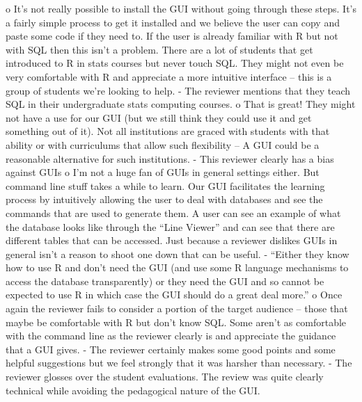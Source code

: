 \documentclass[11pt]{tise_style}
\begin{document}
o	It’s not really possible to install the GUI without going through these steps.  It’s a fairly simple process to get it installed and we believe the user can copy and paste some code if they need to.  If the user is already familiar with R but not with SQL then this isn’t a problem.  There are a lot of students that get introduced to R in stats courses but never touch SQL.  They might not even be very comfortable with R and appreciate a more intuitive interface – this is a group of students we’re looking to help.  
-	The reviewer mentions that they teach SQL in their undergraduate stats computing courses.
o	That is great! They might not have a use for our GUI (but we still think they could use it and get something out of it).  Not all institutions are graced with students with that ability or with curriculums that allow such flexibility – A GUI could be a reasonable alternative for such institutions.
-	This reviewer clearly has a bias against GUIs
o	I’m not a huge fan of GUIs in general settings either.  But command line stuff takes a while to learn.  Our GUI facilitates the learning process by intuitively allowing the user to deal with databases and see the commands that are used to generate them.  A user can see an example of what the database looks like through the “Line Viewer” and can see that there are different tables that can be accessed.  Just because a reviewer dislikes GUIs in general isn’t a reason to shoot one down that can be useful.
-	“Either they know how to use R and don't need the GUI (and use some R language mechanisms to access the database transparently) or they need the GUI and so cannot be expected to use R in which case the GUI should do a great deal more.”
o	Once again the reviewer fails to consider a portion of the target audience – those that maybe be comfortable with R but don’t know SQL.  Some aren’t as comfortable with the command line as the reviewer clearly is and appreciate the guidance that a GUI gives.
-	The reviewer certainly makes some good points and some helpful suggestions but we feel strongly that it was harsher than necessary.
-	The reviewer glosses over the student evaluations.  The review was quite clearly technical while avoiding the pedagogical nature of the GUI.
\end{document}
